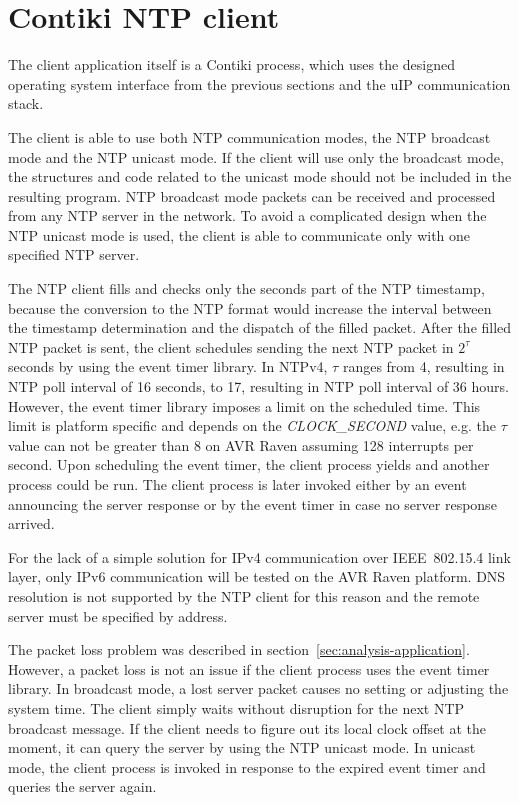
\section{Contiki NTP client}\label{sec:design-client}
The client application itself is a Contiki process,
which uses the designed operating system interface from the previous sections
and the uIP communication stack.

The client is able to use both NTP communication modes,
the NTP broadcast mode and the NTP unicast mode.
If the client will use only the broadcast mode, the structures and code
related to the unicast mode should not be included in the resulting program.
NTP broadcast mode packets can be received and processed from any NTP server in the network.
To avoid a complicated design when the NTP unicast mode is used,
the client is able to communicate only with one specified NTP server.

The NTP client fills and checks only the seconds part of the NTP timestamp,
because the conversion to the NTP format would increase the interval
between the timestamp determination and the dispatch of the filled packet.
After the filled NTP packet is sent, the client schedules
sending the next NTP packet in $2^{\tau}$ seconds
by using the event timer library.
In NTPv4, $\tau$ ranges from 4, resulting in NTP poll interval of 16 seconds,
to 17, resulting in NTP poll interval of 36 hours.
However, the event timer library imposes a limit on the scheduled time.
This limit is platform specific and depends on the {\it{CLOCK\_SECOND}} value,
e.g. the $\tau$ value can not be greater than 8 on AVR Raven assuming 128 interrupts per second.
Upon scheduling the event timer, the client process yields
and another process could be run.
The client process is later invoked either by an event
announcing the server response
or by the event timer in case no server response arrived.

For the lack of a simple solution for IPv4 communication over IEEE~802.15.4 link layer,
only IPv6 communication will be tested on the AVR Raven platform.
DNS resolution is not supported by the NTP client for this reason
and the remote server must be specified by address.

The packet loss problem was described in section~\ref{sec:analysis-application}.
However, a packet loss is not an issue if the client process uses the event timer library.
In broadcast mode, a lost server packet causes no setting or adjusting the system time.
The client simply waits without disruption for the next NTP broadcast message.
If the client needs to figure out its local clock offset at the moment,
it can query the server by using the NTP unicast mode.
In unicast mode, the client process is invoked in response to the expired event timer
and queries the server again.


